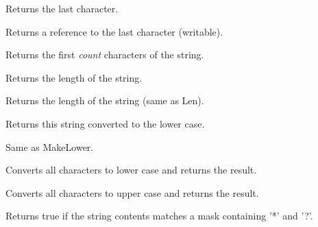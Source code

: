 Returns the last character.


Returns a reference to the last character (writable).

\label{wxstringleft}


Returns the first {\it count} characters of the string.

\label{wxstringlen}


Returns the length of the string.

\label{wxstringlength}


Returns the length of the string (same as Len).

\label{wxstringlower}


Returns this string converted to the lower case.

\label{wxstringlowercase}


Same as MakeLower.

\label{wxstringmakelower}


Converts all characters to lower case and returns the result.

\label{wxstringmakeupper}


Converts all characters to upper case and returns the result.

\label{wxstringmatches}


Returns true if the string contents matches a mask containing '*' and '?'.

\label{wxstringmbstr}



